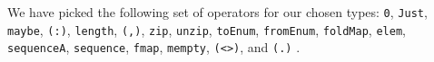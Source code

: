 \documentclass{article} %
\begin{document}
We have picked the following set of operators for our chosen types:
\verb|0|, %
\verb|Just|, %
\verb|maybe|, %
\verb|(:)|, %
\verb|length|, %
\verb|(,)|, %
\verb|zip|, %
\verb|unzip|, %
\verb|toEnum|, %
\verb|fromEnum|, %
\verb|foldMap|, %
\verb|elem|, %
\verb|sequenceA|, %
\verb|sequence|, %
\verb|fmap|, %
\verb|mempty|, %
\verb|(<>)|, %
and \verb|(.)|%
. %
\end{document}
